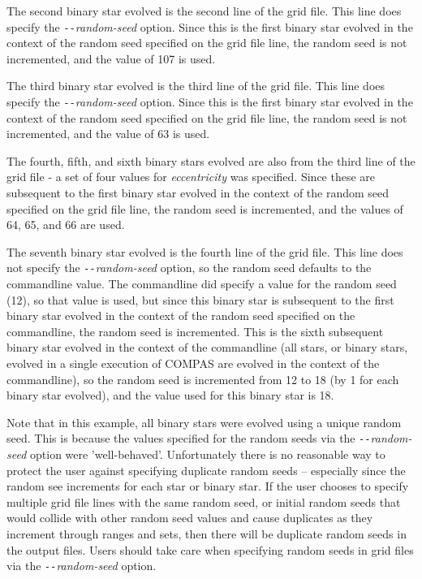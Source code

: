 The second binary star evolved is the second line of the grid file. This line does specify the \textit{\texttt{-{}-}random-seed} option. Since this is the first binary star evolved in the context of the random seed specified on the grid file line, the random seed is not incremented, and the value of 107 is used.

The third binary star evolved is the third line of the grid file. This line does specify the \textit{\texttt{-{}-}random-seed} option. Since this is the first binary star evolved in the context of the random seed specified on the grid file line, the random seed is not incremented, and the value of 63 is used.

The fourth, fifth, and sixth binary stars evolved are also from the third line of the grid file - a set of four values for \textit{eccentricity} was specified. Since these are subsequent to the first binary star evolved in the context of the random seed specified on the grid file line, the random seed is incremented, and the values of 64, 65, and 66 are used.

The seventh binary star evolved is the fourth line of the grid file. This line does not specify the \textit{\texttt{-{}-}random-seed} option, so the random seed defaults to the commandline value. The commandline did specify a value for the random seed (12), so that value is used, but since this binary star is subsequent to the first binary star evolved in the context of the random seed specified on the commandline, the random seed is incremented. This is the sixth subsequent binary star evolved in the context of the commandline (all stars, or binary stars, evolved in a single execution of COMPAS are evolved in the context of the commandline), so  the random seed is incremented from 12 to 18 (by 1 for each binary star evolved), and the value used for this binary star is 18.

Note that in this example, all binary stars were evolved using a unique random seed. This is because the values specified for the random seeds via the \textit{\texttt{-{}-}random-seed} option were 'well-behaved'. Unfortunately there is no reasonable way to protect the user against specifying duplicate random seeds – especially since the random see increments for each star or binary star. If the user chooses to specify multiple grid file lines with the same random seed, or initial random seeds that would collide with other random seed values and cause duplicates as they increment through ranges and sets, then there will be duplicate random seeds in the output files. Users should take care when specifying random seeds in grid files via the \textit{\texttt{-{}-}random-seed} option.

